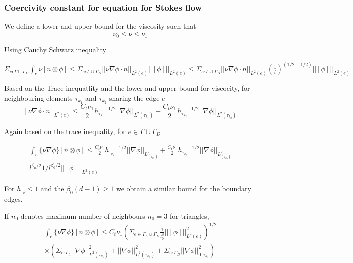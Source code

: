\documentclass[a4paper,12pt]{book}
\begin{document}
\subsubsection{Coercivity constant for equation for Stokes flow} \label{basics}

We define a lower and upper bound for the viscosity such that \\
\begin{equation}
\nu_0 \leq \nu \leq \nu_1
\end{equation}

Using Cauchy Schwarz inequality

$\Sigma_{e \epsilon \Gamma \cup \Gamma_D} \int_e {\nu}[n\otimes \phi] \leq \Sigma_{e \epsilon \Gamma \cup \Gamma_D} ||\nu \nabla \phi \cdot n||_{L^2(e)} ||[\phi]||_{L^2(e)} \leq \Sigma_{e \epsilon \Gamma \cup \Gamma_D} ||\nu \nabla \phi \cdot n||_{L^2(e)} (\frac{1}{l})^{(1/2-1/2)} ||[\phi]||_{L^2(e)}$

Based on the Trace inequatlity and the lower and upper bound for viscocity, for neighbouring elements $\tau_{k_1}$ and $\tau_{k_2}$ sharing the edge $e$ 
\begin{equation}
||{\nu \nabla \phi \cdot n}||_{L^2(e)} \leq \frac{C_t \nu_1}{2} {h_{\tau_{k_1}}}^{-1/2} ||\nabla \phi||_{L^2({\tau_{k_1}})} + \frac{C_t \nu_1}{2} {h_{{\tau_{k_2}}}}^{-1/2} ||\nabla \phi||_{L^2({\tau_{k_2}})}
\end{equation}

Again based on the trace inequality, for $e \in \Gamma \cup \Gamma_D$

\begin{equation}
\begin{split}
\int_e \lbrace \nu \nabla \phi \rbrace[n \otimes \phi] \leq \frac{C_t \nu_1}{2} {h_{{\tau_{k_1}}}}^{-1/2} ||\nabla \phi||_{L^2_{(\tau_{k_1})}} + \frac{C_t \nu_1}{2} {h_{{\tau_{k_2}}}}^{-1/2} ||\nabla \phi||_{L^2_{(\tau_{k_2})}} \\  
l^{\beta_0/2} {1/l}^{\beta_0/2} ||[\phi]||_{L^2(e)}
\end{split}
\end{equation}

For $h_{\tau_k} \leq 1$ and the $\beta_0 (d-1) \geq 1$ we obtain a similar bound for the boundary edges.

If $n_0$ denotes maximum number of neighbours $n_0 = 3$ for triangles,
\begin{equation}
\begin{split}
\int_e \lbrace \nu \nabla \phi \rbrace[n \otimes \phi] \leq C_t \nu_1 \left( \Sigma_{e \in \Gamma_h \cup \Gamma_D} \frac{1}{l^\beta_0} ||[\phi]||^2_{L^2(e)} \right)^{1/2} \\ \times \left( \Sigma_{e \epsilon \Gamma_h} ||\nabla \phi||^2_{L^2(\tau_{k_1})} + ||\nabla \phi||^2_{L^2(\tau_{k_2})} + \Sigma_{e \epsilon \Gamma_D} ||\nabla \phi||^2_{0,\tau_{k_1}} \right)
\end{split}
\end{equation}
\end{document}
